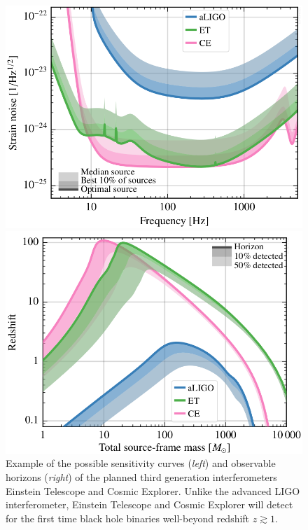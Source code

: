 \documentclass[a4paper,titlepage]{book}     	%
\begin{document}
\begin{figure}[h]
	\begin{minipage}{.49\textwidth}
		\centering
		\includegraphics[width=\textwidth]{./images/ETsensitivity.png}
	\end{minipage}
	\hfill
	\begin{minipage}{.49\textwidth}
		\vspace{-2mm}
		\centering
		\includegraphics[width=1.02\textwidth]{./images/EThorizon.png}	
	\end{minipage}
	\caption{Example of the possible sensitivity curves (\emph{left}) and observable horizons (\emph{right}) of the planned third generation interferometers Einstein Telescope and Cosmic Explorer. Unlike the advanced LIGO interferometer, Einstein Telescope and Cosmic Explorer will detect for the first time black hole binaries well-beyond redshift $z \gtrsim 1$. \cite{EThorizonsensitivity}}\label{fig:ETsensitivity}
\end{figure}
\end{document}
